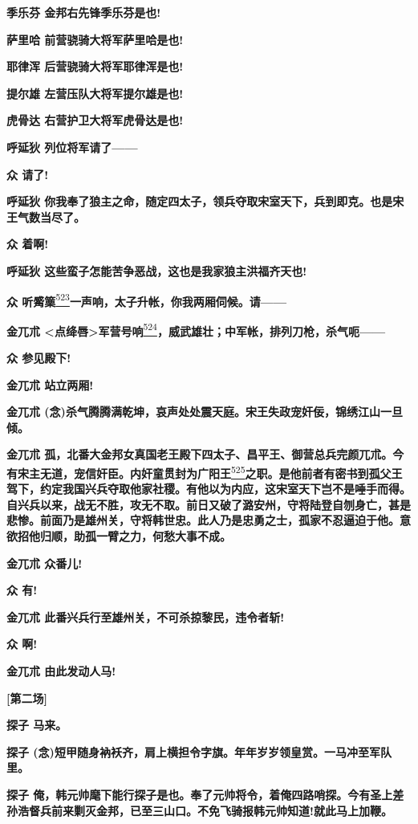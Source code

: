 \textbf{季乐芬 金邦右先锋季乐芬是也!}

\textbf{萨里哈 前营骁骑大将军萨里哈是也!}

\textbf{耶律浑 后营骁骑大将军耶律浑是也!}

\textbf{提尔雄 左营压队大将军提尔雄是也!}

\textbf{虎骨达 右营护卫大将军虎骨达是也!}

\textbf{呼延狄 列位将军请了------}

\textbf{众 请了!}

\textbf{呼延狄
你我奉了狼主之命，随定四太子，领兵夺取宋室天下，兵到即克。也是宋王气数当尽了。}

\textbf{众 着啊!}

\textbf{呼延狄 这些蛮子怎能苦争恶战，这也是我家狼主洪福齐天也!}

\textbf{众
听觱篥}\protect\hyperlink{fn523}{\textsuperscript{523}}\textbf{一声响，太子升帐，你我两厢伺候。请------}

\textbf{金兀朮
\textless{}点绛唇\textgreater{}军营号响}\protect\hyperlink{fn524}{\textsuperscript{524}}\textbf{，威武雄壮；中军帐，排列刀枪，杀气呃------}

\textbf{众 参见殿下!}

\textbf{金兀朮 站立两厢!}

\textbf{金兀朮
(念)杀气腾腾满乾坤，哀声处处震天庭。宋王失政宠奸佞，锦绣江山一旦倾。}

\textbf{金兀朮
孤，北番大金邦女真国老王殿下四太子、昌平王、御营总兵完颜兀朮。今有宋主无道，宠信奸臣。内奸童贯封为广阳王}\protect\hyperlink{fn525}{\textsuperscript{525}}\textbf{之职。是他前者有密书到孤父王驾下，约定我国兴兵夺取他家社稷。有他以为内应，这宋室天下岂不是唾手而得。自兴兵以来，战无不胜，攻无不取。前日又破了潞安州，守将陆登自刎身亡，甚是悲惨。前面乃是雄州关，守将韩世忠。此人乃是忠勇之士，孤家不忍逼迫于他。意欲招他归顺，助孤一臂之力，何愁大事不成。}

\textbf{金兀朮 众番儿!}

\textbf{众 有!}

\textbf{金兀朮 此番兴兵行至雄州关，不可杀掠黎民，违令者斩!}

\textbf{众 啊!}

\textbf{金兀朮 由此发动人马!}

\textbf{{[}第二场{]}}

\textbf{探子 马来。}

\textbf{探子
(念)短甲随身衲袄齐，肩上横担令字旗。年年岁岁领皇赏。一马冲至军队里。}

\textbf{探子
俺，韩元帅麾下能行探子是也。奉了元帅将令，着俺四路哨探。今有圣上差孙浩督兵前来剿灭金邦，已至三山口。不免飞骑报韩元帅知道!就此马上加鞭。}

